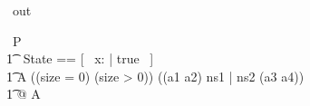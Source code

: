 \begin{circus}
    \circchannel\ out
\end{circus}

\begin{circus}
    \circprocess\ P \circdef \circbegin \\
         \t1 \circstate\ State == [~ x: \nat | true ~] \\
        \t1 A \circdef \lcircguard ((size = 0) \lor (size > 0)) \rcircguard \circguard ((a1 \extchoice a2) \linter ns1 | ns2 \rinter (a3 \extchoice a4))
                    \\ %
        \t1 @ A
    \circend
\end{circus}

